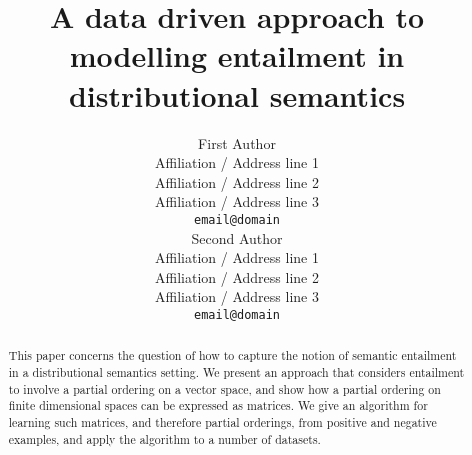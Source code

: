 \documentclass[11pt]{article}
\title{A data driven approach to modelling  entailment in distributional semantics}
\author{First Author \\
  Affiliation / Address line 1 \\
  Affiliation / Address line 2 \\
  Affiliation / Address line 3 \\
  {\tt email@domain} \\\And
  Second Author \\
  Affiliation / Address line 1 \\
  Affiliation / Address line 2 \\
  Affiliation / Address line 3 \\
  {\tt email@domain} \\}
\date{}
\begin{document}
\maketitle

\begin{abstract}
This paper concerns the question of how to capture the notion of semantic entailment in a distributional semantics setting. We present an approach that considers entailment to involve a partial ordering on a vector space, and show how a partial ordering on finite dimensional spaces can be expressed as matrices. We give an algorithm for learning such matrices, and therefore partial orderings, from positive and negative examples, and apply the algorithm to a number of datasets.
\end{abstract}
















\newpage



\end{document}
